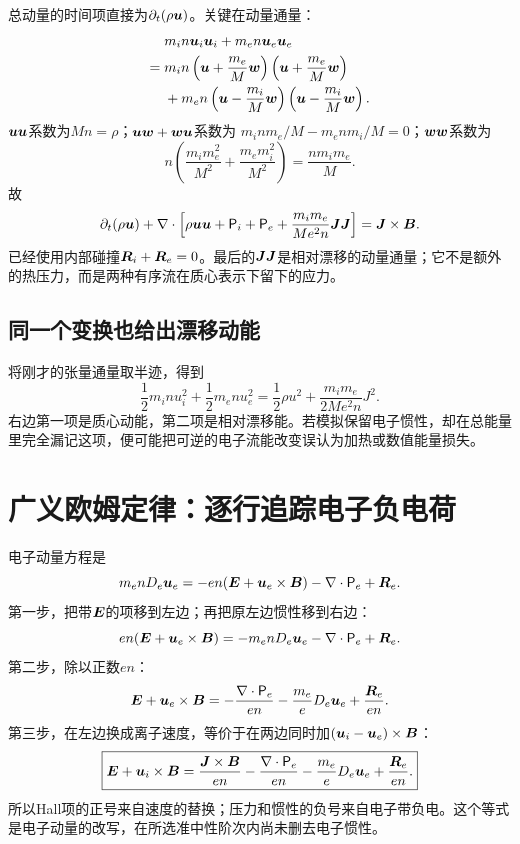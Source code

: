 总动量的时间项直接为$\partial_t(\rho\bm{u})$。关键在动量通量：
\begin{align}
&m_in\bm{u}_i\bm{u}_i+m_en\bm{u}_e\bm{u}_e\\
={}&m_in\left(\bm{u}+\frac{m_e}{M}\bm{w}\right)
\left(\bm{u}+\frac{m_e}{M}\bm{w}\right)\nonumber\\
&+m_en\left(\bm{u}-\frac{m_i}{M}\bm{w}\right)
\left(\bm{u}-\frac{m_i}{M}\bm{w}\right).\nonumber
\end{align}
$\bm{u}\bm{u}$系数为$Mn=\rho$；$\bm{u}\bm{w}+\bm{w}\bm{u}$系数为
$m_inm_e/M-m_enm_i/M=0$；$\bm{w}\bm{w}$系数为
\begin{equation}
n\left(\frac{m_im_e^2}{M^2}+\frac{m_em_i^2}{M^2}\right)
=\frac{nm_im_e}{M}.
\end{equation}
故
\begin{equation}
\partial_t(\rho\bm{u})+\nabla\cdot
\left[\rho\bm{u}\bm{u}+\mathsf P_i+\mathsf P_e+
\frac{m_im_e}{Me^2n}\bm{J}\bm{J}\right]=\bm{J}\times\bm{B}.
\label{hall:eq:total-momentum-exact}
\end{equation}
已经使用内部碰撞$\bm{R}_i+\bm{R}_e=0$。最后的$\bm{J}\bm{J}$是相对漂移的动量通量；它不是额外的热压力，而是两种有序流在质心表示下留下的应力。

\subsection{同一个变换也给出漂移动能}
将刚才的张量通量取半迹，得到
\begin{equation}
\frac12m_inu_i^2+\frac12m_enu_e^2
=\frac12\rho u^2+
\frac{m_im_e}{2Me^2n}J^2.
\label{hall:eq:drift-energy}
\end{equation}
右边第一项是质心动能，第二项是相对漂移能。若模拟保留电子惯性，却在总能量里完全漏记这项，便可能把可逆的电子流能改变误认为加热或数值能量损失。

\section{广义欧姆定律：逐行追踪电子负电荷}
电子动量方程是
\begin{equation}
m_enD_e\bm{u}_e=-en(\bm{E}+\bm{u}_e\times\bm{B})
-\nabla\cdot\mathsf P_e+\bm{R}_e.
\end{equation}
第一步，把带$\bm{E}$的项移到左边；再把原左边惯性移到右边：
\begin{equation}
en(\bm{E}+\bm{u}_e\times\bm{B})
=-m_enD_e\bm{u}_e-\nabla\cdot\mathsf P_e+\bm{R}_e.
\end{equation}
第二步，除以正数$en$：
\begin{equation}
\bm{E}+\bm{u}_e\times\bm{B}
=-\frac{\nabla\cdot\mathsf P_e}{en}
-\frac{m_e}{e}D_e\bm{u}_e+\frac{\bm{R}_e}{en}.
\label{hall:eq:electron-ohm}
\end{equation}
第三步，在左边换成离子速度，等价于在两边同时加$(\bm{u}_i-\bm{u}_e)\times\bm{B}$：
\begin{equation}
\boxed{\bm{E}+\bm{u}_i\times\bm{B}
=\frac{\bm{J}\times\bm{B}}{en}
-\frac{\nabla\cdot\mathsf P_e}{en}
-\frac{m_e}{e}D_e\bm{u}_e+\frac{\bm{R}_e}{en}.}
\label{hall:eq:generalized-ohm}
\end{equation}
所以Hall项的正号来自速度的替换；压力和惯性的负号来自电子带负电。这个等式是电子动量的改写，在所选准中性阶次内尚未删去电子惯性。

